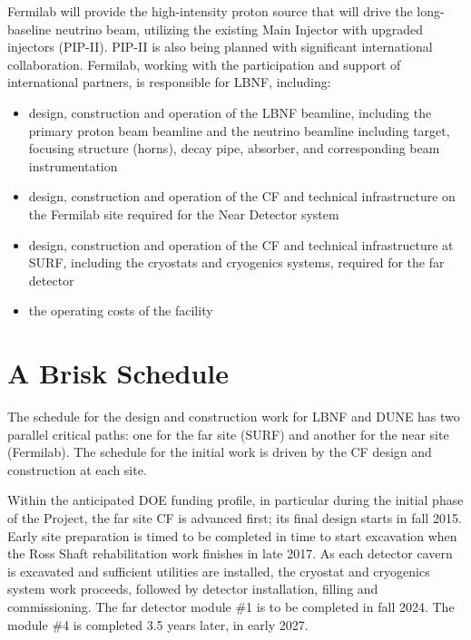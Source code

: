Fermilab will provide the high-intensity proton source that will drive the long-baseline neutrino beam, utilizing the existing Main Injector with upgraded injectors (PIP-II).  PIP-II is also being planned with significant international collaboration.  Fermilab, working %
with the participation and support of international partners, is responsible for %
LBNF, including:
\begin{itemize}
\item design, construction and operation of the LBNF beamline, including the primary proton beam beamline and the neutrino beamline including target, focusing structure (horns), decay pipe, absorber, and corresponding beam instrumentation
\item design, construction and operation of the CF and technical infrastructure on the Fermilab site required for the Near Detector system
\item design, construction and operation of the CF and technical infrastructure %
at SURF, including the cryostats and cryogenics systems, required for the far detector
\item %
the operating costs of the facility
\end{itemize}


\section{A Brisk Schedule} %

The schedule for the design and construction work for LBNF and DUNE has two parallel critical paths: one for the %
far site (SURF) and %
another for the %
near site (Fermilab). The schedule for the initial work is driven by the CF design and construction at each site. 

Within the anticipated DOE funding profile, in particular during the initial phase of the Project, the far site CF is advanced first; its final design starts in fall 2015. Early site preparation is timed to be completed %
in time to start excavation when the Ross Shaft rehabilitation work finishes %
 in late 2017. As each detector %
 cavern is excavated and sufficient utilities are installed, the cryostat and cryogenics system work proceeds, followed by detector installation, filling and commissioning. The far detector module \#1 is to be completed in fall 2024. The module \#4 is completed 3.5 years later, in early 2027. 

